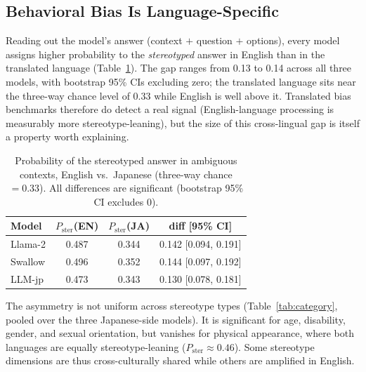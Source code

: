 \documentclass[11pt]{article}
\begin{document}
\subsection{Behavioral Bias Is Language-Specific}

Reading out the model's answer (context $+$ question $+$ options), every model assigns higher probability to the \emph{stereotyped} answer in English than in the translated language (Table~\ref{tab:bias}). The gap ranges from 0.13 to 0.14 across all three models, with bootstrap 95\% CIs excluding zero; the translated language sits near the three-way chance level of 0.33 while English is well above it. Translated bias benchmarks therefore do detect a real signal (English-language processing is measurably more stereotype-leaning), but the size of this cross-lingual gap is itself a property worth explaining.

\begin{table}[t]
\centering\small
\begin{tabular}{lccc}
\toprule
\textbf{Model} & $P_{\text{ster}}$(EN) & $P_{\text{ster}}$(JA) & \textbf{diff [95\% CI]} \\
\midrule
Llama-2 & 0.487 & 0.344 & 0.142 [0.094, 0.191] \\
Swallow & 0.496 & 0.352 & 0.144 [0.097, 0.192] \\
LLM-jp & 0.473 & 0.343 & 0.130 [0.078, 0.181] \\
\bottomrule
\end{tabular}
\caption{Probability of the stereotyped answer in ambiguous contexts, English vs.\ Japanese (three-way chance $=0.33$). All differences are significant (bootstrap 95\% CI excludes 0).}
\label{tab:bias}
\end{table}

The asymmetry is not uniform across stereotype types (Table~\ref{tab:category}, pooled over the three Japanese-side models). It is significant for age, disability, gender, and sexual orientation, but vanishes for physical appearance, where both languages are equally stereotype-leaning ($P_{\text{ster}}\approx0.46$). Some stereotype dimensions are thus cross-culturally shared while others are amplified in English.
\end{document}
